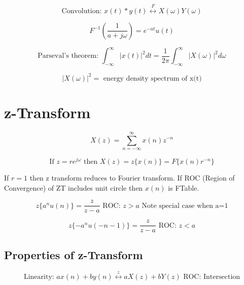 \documentclass[a4paper]{article}
\begin{document}
\begin{displaymath}
\textrm{Convolution:  }
x(t)*y(t)
\stackrel{F}{\longleftrightarrow}
X(\omega)Y(\omega)
\end{displaymath}

\begin{displaymath}
F^{-1} (\frac{1}{a+j\omega}) = e^{-at}u(t)
\end{displaymath}

\begin{displaymath}
\textrm{Parseval's theorem:  }
\int_{-\infty}^{\infty}
|x(t)|^2 dt = \frac{1}{2\pi}
\int_{-\infty}^{\infty}
|X(\omega)|^2 d\omega
\end{displaymath}

\begin{displaymath}
|X(\omega)|^2 = \textrm{ energy density spectrum of x(t)}
\end{displaymath}


\section{z-Transform}

\begin{displaymath}
X(z)=\sum_{n=-\infty}^{\infty} x(n)z^{-n}
\end{displaymath}

\begin{displaymath}
\textrm{If $z=re^{j\omega}$ then }
X(z)=z\{x(n)\}=F\{x(n)r^{-n}\}
\end{displaymath}

If $r=1$ then z transform reduces to Fourier transform. If ROC (Region of
Convergence) of ZT includes unit circle then $x(n)$ is FTable.

\begin{displaymath}
z\{a^nu(n)\}=\frac{z}{z-a} \textrm{ ROC: } z>a
\textrm{ Note special case when a=1}
\end{displaymath}

\begin{displaymath}
z\{-a^nu(-n-1)\}=\frac{z}{z-a} \textrm{ ROC: } z<a
\end{displaymath}

\subsection{Properties of z-Transform}


\begin{displaymath}
\textrm{Linearity:  }
ax(n) + by(n)
\stackrel{z}{\longleftrightarrow}
aX(z) + bY(z)
\textrm{  ROC: Intersection}
\end{displaymath}
\end{document}
